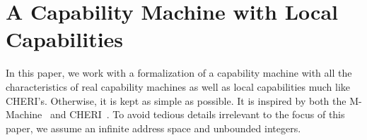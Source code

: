 \documentclass[format=acmsmall, review=true, screen=true]{acmart}
\begin{document}





\section{A Capability Machine with Local Capabilities}
\label{sec:capab-mach-with}
In this paper, we work with a formalization of a capability machine with all the characteristics of real capability machines as well as local capabilities much like CHERI's.
Otherwise, it is kept as simple as possible.
It is inspired by both the M-Machine~\citep{Carter:1994:HSF:195473.195579} and CHERI~\citep{Watson2015Cheri}.
To avoid tedious details irrelevant to the focus of this paper, we assume an infinite address space and unbounded integers.
\end{document}
